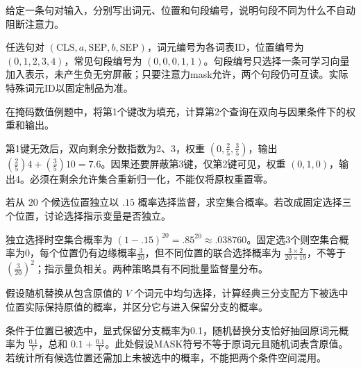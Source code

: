 
\begin{exercises}
\begin{exercise} 给定一条句对输入，分别写出词元、位置和句段编号，说明句段不同为什么不自动阻断注意力。

\begin{solution}
任选句对 $(\mathrm{CLS},a,\mathrm{SEP},b,\mathrm{SEP})$，词元编号为各词表ID，位置编号为 $(0,1,2,3,4)$，常见句段编号为 $(0,0,0,1,1)$。句段编号只选择一条可学习向量加入表示，未产生负无穷屏蔽；只要注意力mask允许，两个句段仍可互读。实际特殊词元ID以固定制品为准。
\end{solution}
\end{exercise}

\begin{exercise} 在掩码数值例题中，将第1个键改为填充，计算第2个查询在双向与因果条件下的权重和输出。

\begin{solution}
第1键无效后，双向剩余分数指数为2、3，权重 $(0,\frac{2}{5},\frac{3}{5})$，输出 $(\frac{2}{5})4+(\frac{3}{5})10=7.6$。因果还要屏蔽第3键，仅第2键可见，权重 $(0,1,0)$，输出4。必须在剩余允许集合重新归一化，不能仅将原权重置零。
\end{solution}
\end{exercise}

\begin{exercise} 若从 $20$ 个候选位置独立以 $.15$ 概率选择监督，求空集合概率。若改成固定选择三个位置，讨论选择指示变量是否独立。

\begin{solution}
独立选择时空集合概率为 $(1-.15)^{20}=.85^{20}\approx.038760$。固定选3个则空集合概率为0，每个位置仍有边缘概率$\frac{3}{20}$，但不同位置的联合选择概率为 $\frac{3\times2}{20\times19}$，不等于 $(\frac{3}{20})^2$；指示量负相关。两种策略具有不同批量监督量分布。
\end{solution}
\end{exercise}

\begin{exercise}\optional 假设随机替换从包含原值的 $V$ 个词元中均匀选择，计算经典三分支配方下被选中位置实际保持原值的概率，并区分它与进入保留分支的概率。

\begin{solution}
条件于位置已被选中，显式保留分支概率为0.1，随机替换分支恰好抽回原词元概率为 $\frac{0.1}{V}$，总和 $0.1+\frac{0.1}{V}$。此处假设MASK符号不等于原词元且随机词表含原值。若统计所有候选位置还需加上未被选中的概率，不能把两个条件空间混用。
\end{solution}
\end{exercise}


\end{exercises}
